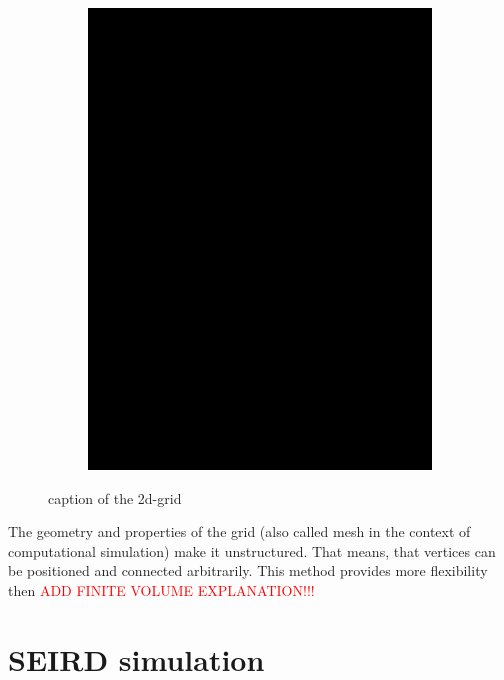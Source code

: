 \begin{figure}
\begin{center}
\begin{subfigure}[b]{0.3\textwidth}
			\includegraphics[width=\textwidth]{./figures/2d_grid_test.png}
		\end{subfigure}
	\end{center}
	\caption{caption of the 2d-grid}
	\label{fig:2d-grid}
\end{figure}

The geometry and properties of the grid (also called mesh in the context of computational simulation) make it unstructured.
That means, that vertices can be positioned and connected arbitrarily. This method provides more flexibility then 
\textcolor{red}{ADD FINITE VOLUME EXPLANATION!!!}


\section{SEIRD simulation}

